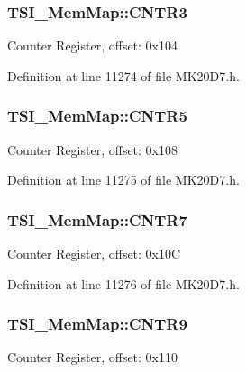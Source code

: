 \subsubsection[{\texorpdfstring{C\+N\+T\+R3}{CNTR3}}]{ T\+S\+I\+\_\+\+Mem\+Map\+::\+C\+N\+T\+R3}\hypertarget{struct_t_s_i___mem_map_a6784d9dce99cc4d0e04e4e527513c525}{}\label{struct_t_s_i___mem_map_a6784d9dce99cc4d0e04e4e527513c525}
Counter Register, offset\+: 0x104 

Definition at line 11274 of file M\+K20\+D7.\+h.

\subsubsection[{\texorpdfstring{C\+N\+T\+R5}{CNTR5}}]{ T\+S\+I\+\_\+\+Mem\+Map\+::\+C\+N\+T\+R5}\hypertarget{struct_t_s_i___mem_map_a16e7aed31d05ac2b570308c208471959}{}\label{struct_t_s_i___mem_map_a16e7aed31d05ac2b570308c208471959}
Counter Register, offset\+: 0x108 

Definition at line 11275 of file M\+K20\+D7.\+h.

\subsubsection[{\texorpdfstring{C\+N\+T\+R7}{CNTR7}}]{ T\+S\+I\+\_\+\+Mem\+Map\+::\+C\+N\+T\+R7}\hypertarget{struct_t_s_i___mem_map_a3c2f3ddd1d3725bef9e71fdf30a5ee8a}{}\label{struct_t_s_i___mem_map_a3c2f3ddd1d3725bef9e71fdf30a5ee8a}
Counter Register, offset\+: 0x10C 

Definition at line 11276 of file M\+K20\+D7.\+h.

\subsubsection[{\texorpdfstring{C\+N\+T\+R9}{CNTR9}}]{ T\+S\+I\+\_\+\+Mem\+Map\+::\+C\+N\+T\+R9}\hypertarget{struct_t_s_i___mem_map_a1792ec66ee609674ea272871f5abcf1c}{}\label{struct_t_s_i___mem_map_a1792ec66ee609674ea272871f5abcf1c}
Counter Register, offset\+: 0x110 


